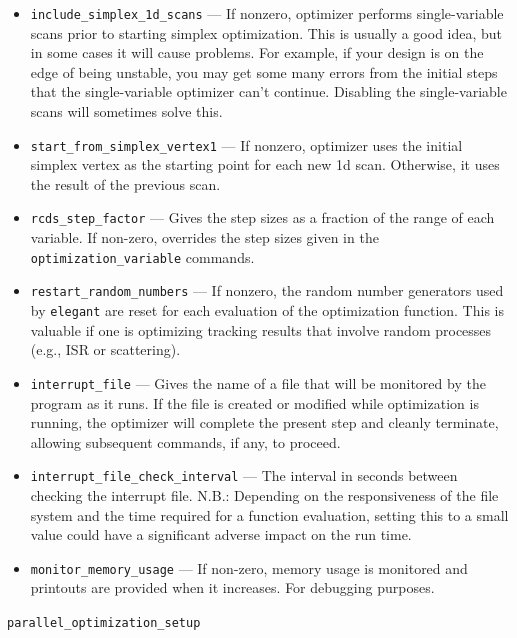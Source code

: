 \documentclass[11pt]{article}
\begin{document}
\begin{itemize}
\item \verb|include_simplex_1d_scans| --- If nonzero, optimizer performs single-variable scans prior to 
 starting simplex optimization.  This is usually a good idea, but in some cases it will cause problems.
 For example, if your design is on the edge of being unstable, you may get some many errors from the
 initial steps that the single-variable optimizer can't continue.  Disabling the
 single-variable scans will sometimes solve this.

\item \verb|start_from_simplex_vertex1| --- If nonzero, optimizer uses the initial simplex vertex as the
 starting point for each new 1d scan.  Otherwise, it uses the result of the previous scan.

\item \verb|rcds_step_factor| --- Gives the step sizes as a fraction of the range of each variable.
  If non-zero, overrides the step sizes given in the \verb|optimization_variable| commands.

\item \verb|restart_random_numbers| --- If nonzero, the random number generators used by {\tt elegant} are
 reset for each evaluation of the optimization function.  This is valuable if one is optimizing tracking
 results that involve random processes (e.g., ISR or scattering).

\item \verb|interrupt_file| --- Gives the name of a file that will be monitored by the program as it runs.
  If the file is created or modified while optimization is running, the optimizer will complete the present
  step and cleanly terminate, allowing subsequent commands, if any, to proceed.
\item \verb|interrupt_file_check_interval| --- The interval in seconds between checking the interrupt file.
  N.B.: Depending on the responsiveness of the file system and the time required for a function evaluation, setting
  this to a small value could have a significant adverse impact on the run time. 
\item \verb|monitor_memory_usage| --- If non-zero, memory usage is monitored and printouts are provided when it 
  increases. For debugging purposes.
\end{itemize}

\newpage
\begin{center}{\Large\verb|parallel_optimization_setup|}\end{center}
\end{document}
